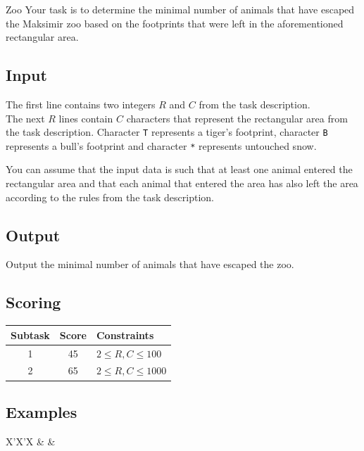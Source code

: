 \begin{statement}[
  problempoints=110,
  timelimit=1 second,
  memorylimit=512 MiB,
]{Zoo}
Your task is to determine the minimal number of animals that have
escaped the Maksimir zoo based on the footprints that were left in the
aforementioned rectangular area.

\subsection*{Input}
The first line contains two integers $R$ and $C$ from the task description. \\
The next $R$ lines contain $C$ characters that represent the rectangular area
from the task description. Character \texttt{T} represents a tiger's footprint,
character \texttt{B} represents a bull's footprint and character \texttt{*}
represents untouched snow.

You can assume that the input data is such that at least one animal entered the
rectangular area and that each animal that entered the area has also left the
area according to the rules from the task description.

\subsection*{Output}
Output the minimal number of animals that have escaped the zoo.

\subsection*{Scoring}
{\renewcommand{\arraystretch}{1.4}
  \setlength{\tabcolsep}{6pt}
  \begin{tabular}{ccl}
 Subtask & Score & Constraints \\ \midrule
  1 & 45 & $2 \le R, C \le 100$ \\
  2 & 65 & $2 \le R, C \le 1000$ \\
\end{tabular}}

\subsection*{Examples}
\begin{tabularx}{\textwidth}{X'X'X}
 &
 &
\end{tabularx}


\end{statement}
